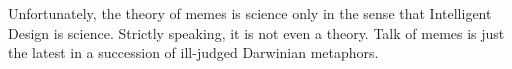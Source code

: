 Unfortunately, the theory of memes is science only in the sense that Intelligent
Design is science. Strictly speaking, it is not even a theory. Talk of memes is
just the latest in a succession of ill-judged Darwinian metaphors.
